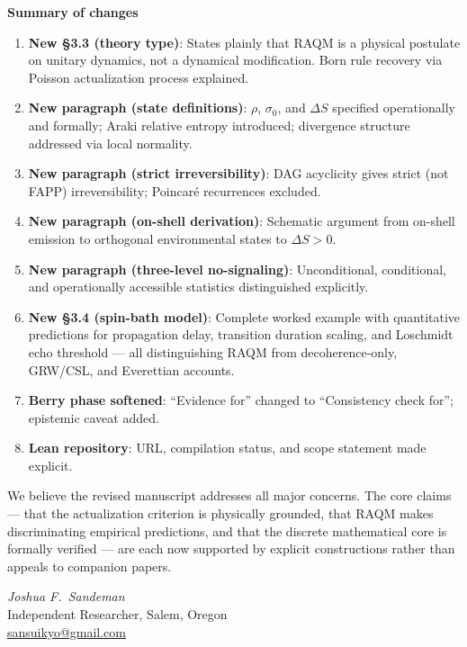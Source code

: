 \documentclass[11pt]{article}
\begin{document}
\noindent\textbf{Summary of changes}

\begin{enumerate}[itemsep=4pt]

\item \textbf{New \S3.3 (theory type)}: States plainly that RAQM is a physical
postulate on unitary dynamics, not a dynamical modification. Born rule recovery
via Poisson actualization process explained.

\item \textbf{New paragraph (state definitions)}: $\rho$, $\sigma_0$, and
$\Delta S$ specified operationally and formally; Araki relative entropy
introduced; divergence structure addressed via local normality.

\item \textbf{New paragraph (strict irreversibility)}: DAG acyclicity gives
strict (not FAPP) irreversibility; Poincar\'{e} recurrences excluded.

\item \textbf{New paragraph (on-shell derivation)}: Schematic argument from
on-shell emission to orthogonal environmental states to $\Delta S > 0$.

\item \textbf{New paragraph (three-level no-signaling)}: Unconditional,
conditional, and operationally accessible statistics distinguished
explicitly.

\item \textbf{New \S3.4 (spin-bath model)}: Complete worked example with
quantitative predictions for propagation delay, transition duration scaling,
and Loschmidt echo threshold — all distinguishing RAQM from decoherence-only,
GRW/CSL, and Everettian accounts.

\item \textbf{Berry phase softened}: ``Evidence for'' changed to ``Consistency
check for''; epistemic caveat added.

\item \textbf{Lean repository}: URL, compilation status, and scope statement
made explicit.

\end{enumerate}

\bigskip\noindent
We believe the revised manuscript addresses all major concerns.
The core claims — that the actualization criterion is physically grounded,
that RAQM makes discriminating empirical predictions, and that the discrete
mathematical core is formally verified — are each now supported by explicit
constructions rather than appeals to companion papers.

\bigskip
\noindent
\textit{Joshua F.\ Sandeman}\\
Independent Researcher, Salem, Oregon\\
\href{mailto:sansuikyo@gmail.com}{sansuikyo@gmail.com}
\end{document}
